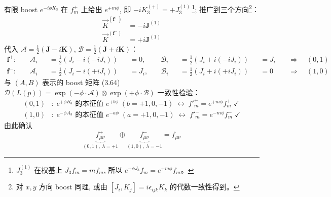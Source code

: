 有限 boost $e^{-i\phi K_3}$ 在 $f^+_m$ 上给出 $e^{+m\phi}$,
即 $-iK_3^{(+)}=+J_3^{(1)}$\,\footnote{%
$J_3^{(1)}$ 在权基上 $J_3 f_m=mf_m$, 所以 $e^{+\phi J_3}f_m=e^{+m\phi}f_m$。};
推广到三个方向\footnote{%
对 $x,y$ 方向 boost 同理, 或由 $[J_i,K_j]=i\epsilon_{ijk}K_k$ 的代数一致性得到。}：
\begin{subequations}\label{eq:K-on-fpm}
\begin{align}
    \vec{K}^{(\boldsymbol{f}^+)} &= -i\boldsymbol{J}^{(1)} \\
    \vec{K}^{(\boldsymbol{f}^-)} &= +i\boldsymbol{J}^{(1)}
\end{align}
\end{subequations}
代入 $\boldsymbol{\mathcal{A}}=\frac{1}{2}(\boldsymbol{J}-i\boldsymbol{K})$,
$\boldsymbol{\mathcal{B}}=\frac{1}{2}(\boldsymbol{J}+i\boldsymbol{K})$：
\begin{subequations}\label{eq:AB-identification}
\begin{align}
    \boldsymbol{f}^+: &\quad 
    \mathcal{A}_i &&= \tfrac{1}{2}(J_i-i(-iJ_i)) &&= 0, &\quad
    \mathcal{B}_i &&= \tfrac{1}{2}(J_i+i(-iJ_i)) &&= J_i 
    &\quad\Longrightarrow\quad (0,1) \\
    \boldsymbol{f}^-: &\quad
    \mathcal{A}_i &&= \tfrac{1}{2}(J_i-i(+iJ_i)) &&= J_i, &\quad
    \mathcal{B}_i &&= \tfrac{1}{2}(J_i+i(+iJ_i)) &&= 0
    &\quad\Longrightarrow\quad (1,0)
\end{align}
\end{subequations}
与 $(A,B)$ 表示的 boost 矩阵 (3.64) 
$\mathscr{D}(L(p))=\exp(-\phi\cdot\boldsymbol{\mathcal{A}})\otimes\exp(+\phi\cdot\boldsymbol{\mathcal{B}})$ 
一致性检验：
\begin{subequations}\label{eq:boost-check}
\begin{align}
    (0,1)&: \; e^{+\phi B_3} \text{ 的本征值 } e^{+b\phi}\;(b=+1,0,-1)
    \;\longleftrightarrow\; f'^+_m=e^{+m\phi}f^+_m \;\checkmark \\
    (1,0)&: \; e^{-\phi A_3} \text{ 的本征值 } e^{-a\phi}\;(a=+1,0,-1)
    \;\longleftrightarrow\; f'^-_m=e^{-m\phi}f^-_m \;\checkmark
\end{align}
\end{subequations}
由此确认
\begin{equation}
    \boxed{
    \underbrace{f^+_{\mu\nu}}_{(0,1),\;\lambda=+1} \oplus 
    \underbrace{f^-_{\mu\nu}}_{(1,0),\;\lambda=-1} = f_{\mu\nu}
    }
    \label{eq:dictionary}
\end{equation}


